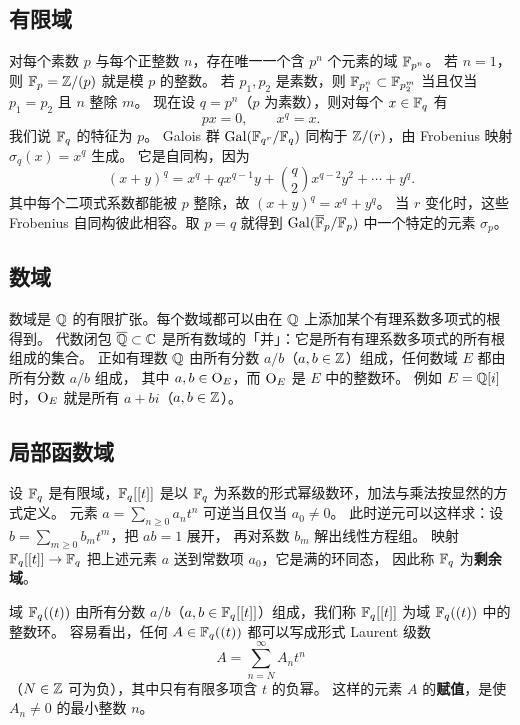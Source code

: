 \subsection{有限域}

对每个素数 $p$ 与每个正整数 $n$，存在唯一一个含 $p^n$ 个元素的域 $\mathbb{F}_{p^n}$。
若 $n=1$，则 $\mathbb{F}_p=\mathbb{Z}/(p)$ 就是模 $p$ 的整数。
若 $p_1,p_2$ 是素数，则 $\mathbb{F}_{p_1^n}\subset\mathbb{F}_{p_2^m}$ 当且仅当 $p_1=p_2$ 且 $n$ 整除 $m$。
现在设 $q=p^n$（$p$ 为素数），则对每个 $x\in\mathbb{F}_q$ 有
\[
px=0,\qquad x^q=x.
\]
我们说 $\mathbb{F}_q$ 的特征为 $p$。
Galois 群 $\mathrm{Gal}(\mathbb{F}_{q^r}/\mathbb{F}_q)$ 同构于 $\mathbb{Z}/(r)$，由 Frobenius 映射 $\sigma_q(x)=x^q$ 生成。
它是自同构，因为
\[
(x+y)^q=x^q+qx^{q-1}y+\binom{q}{2}x^{q-2}y^2+\cdots+y^q .
\]
其中每个二项式系数都能被 $p$ 整除，故 $(x+y)^q=x^q+y^q$。
当 $r$ 变化时，这些 Frobenius 自同构彼此相容。取 $p=q$ 就得到 $\mathrm{Gal}(\overline{\mathbb{F}}_p/\mathbb{F}_p)$ 中一个特定的元素 $\sigma_p$。

\subsection{数域}

数域是 $\mathbb{Q}$ 的有限扩张。每个数域都可以由在 $\mathbb{Q}$ 上添加某个有理系数多项式的根得到。
代数闭包 $\overline{\mathbb{Q}}\subset\mathbb{C}$ 是所有数域的「并」：它是所有有理系数多项式的所有根组成的集合。
正如有理数 $\mathbb{Q}$ 由所有分数 $a/b$（$a,b\in\mathbb{Z}$）组成，任何数域 $E$ 都由所有分数 $a/b$ 组成，
其中 $a,b\in\mathrm{O}_E$，而 $\mathrm{O}_E$ 是 $E$ 中的整数环。
例如 $E=\mathbb{Q}[i]$ 时，$\mathrm{O}_E$ 就是所有 $a+bi$（$a,b\in\mathbb{Z}$）。

\subsection{局部函数域}

设 $\mathbb{F}_q$ 是有限域，$\mathbb{F}_q[[t]]$ 是以 $\mathbb{F}_q$ 为系数的形式幂级数环，加法与乘法按显然的方式定义。
元素 $a=\sum_{n\ge 0}a_nt^n$ 可逆当且仅当 $a_0\neq 0$。
此时逆元可以这样求：设 $b=\sum_{m\ge 0}b_mt^m$，把 $ab=1$ 展开，
再对系数 $b_m$ 解出线性方程组。
映射 $\mathbb{F}_q[[t]]\to\mathbb{F}_q$ 把上述元素 $a$ 送到常数项 $a_0$，它是满的环同态，
因此称 $\mathbb{F}_q$ 为\textbf{剩余域}。

域 $\mathbb{F}_q((t))$ 由所有分数 $a/b$（$a,b\in\mathbb{F}_q[[t]]$）组成，我们称 $\mathbb{F}_q[[t]]$ 为域 $\mathbb{F}_q((t))$ 中的整数环。
容易看出，任何 $A\in\mathbb{F}_q((t))$ 都可以写成形式 Laurent 级数
\[
A=\sum_{n=N}^{\infty}A_nt^n
\]
（$N\in\mathbb{Z}$ 可为负），其中只有有限多项含 $t$ 的负幂。
这样的元素 $A$ 的\textbf{赋值}，是使 $A_n\neq 0$ 的最小整数 $n$。

